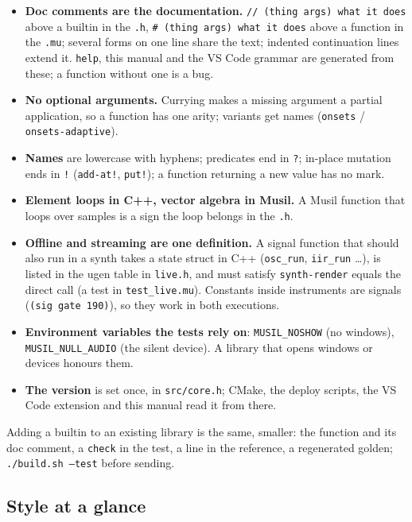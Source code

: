 \documentclass[11pt,a4paper]{article}
\newcommand{\musil}[1]{\lstinline[style=musilinline]{#1}}
\begin{document}
\begin{itemize}[nosep]
  \item \textbf{Doc comments are the documentation.} \texttt{// (thing args) what it does}
        above a builtin in the \texttt{.h}, \texttt{\# (thing args) what it does} above a
        function in the \texttt{.mu}; several forms on one line share the text; indented
        continuation lines extend it. \musil{help}, this manual and the VS Code grammar are
        generated from these; a function without one is a bug.
  \item \textbf{No optional arguments.} Currying makes a missing argument a partial
        application, so a function has one arity; variants get names (\musil{onsets} /
        \musil{onsets-adaptive}).
  \item \textbf{Names} are lowercase with hyphens; predicates end in \texttt{?}; in-place
        mutation ends in \texttt{!} (\musil{add-at!}, \musil{put!}); a function returning a
        new value has no mark.
  \item \textbf{Element loops in C++, vector algebra in Musil.} A Musil function that loops
        over samples is a sign the loop belongs in the \texttt{.h}.
  \item \textbf{Offline and streaming are one definition.} A signal function that should
        also run in a synth takes a state struct in C++ (\texttt{osc\_run}, \texttt{iir\_run}
        \ldots), is listed in the ugen table in \texttt{live.h}, and must satisfy
        \musil{synth-render} equals the direct call (a test in \texttt{test\_live.mu}).
        Constants inside instruments are signals (\musil{(sig gate 190)}), so they work in
        both executions.
  \item \textbf{Environment variables the tests rely on}: \texttt{MUSIL\_NOSHOW} (no
        windows), \texttt{MUSIL\_NULL\_AUDIO} (the silent device). A library that opens
        windows or devices honours them.
  \item \textbf{The version} is set once, in \texttt{src/core.h}; CMake, the deploy
        scripts, the VS Code extension and this manual read it from there.
\end{itemize}

Adding a builtin to an existing library is the same, smaller: the function and its doc
comment, a \musil{check} in the test, a line in the reference, a regenerated golden;
\texttt{./build.sh --test} before sending.

\subsection{Style at a glance}
\end{document}
